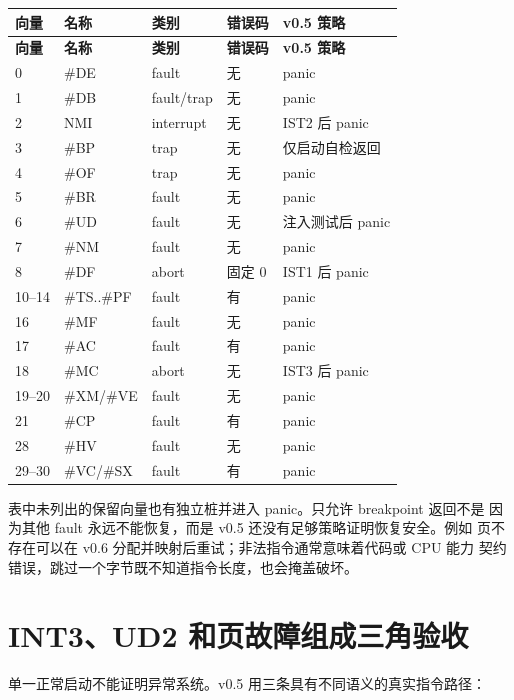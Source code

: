 \begin{longtable}{L{0.08\textwidth}L{0.14\textwidth}L{0.17\textwidth}L{0.20\textwidth}L{0.27\textwidth}}
\toprule
\textbf{向量} & \textbf{名称} & \textbf{类别} & \textbf{错误码} & \textbf{v0.5 策略}\\
\midrule
\endfirsthead
\toprule
\textbf{向量} & \textbf{名称} & \textbf{类别} & \textbf{错误码} & \textbf{v0.5 策略}\\
\midrule
{} & \#DE & fault & 无 & panic\\
1 & \#DB & fault/trap & 无 & panic\\
2 & NMI & interrupt & 无 & IST2 后 panic\\
3 & \#BP & trap & 无 & 仅启动自检返回\\
4 & \#OF & trap & 无 & panic\\
5 & \#BR & fault & 无 & panic\\
6 & \#UD & fault & 无 & 注入测试后 panic\\
7 & \#NM & fault & 无 & panic\\
8 & \#DF & abort & 固定 0 & IST1 后 panic\\
10--14 & \#TS..\#PF & fault & 有 & panic\\
16 & \#MF & fault & 无 & panic\\
17 & \#AC & fault & 有 & panic\\
18 & \#MC & abort & 无 & IST3 后 panic\\
19--20 & \#XM/\#VE & fault & 无 & panic\\
21 & \#CP & fault & 有 & panic\\
28 & \#HV & fault & 无 & panic\\
29--30 & \#VC/\#SX & fault & 有 & panic\\
\bottomrule
\end{longtable}

表中未列出的保留向量也有独立桩并进入 panic。只允许 breakpoint 返回不是
因为其他 fault 永远不能恢复，而是 v0.5 还没有足够策略证明恢复安全。例如
页不存在可以在 v0.6 分配并映射后重试；非法指令通常意味着代码或 CPU 能力
契约错误，跳过一个字节既不知道指令长度，也会掩盖破坏。

\section{INT3、UD2 和页故障组成三角验收}

单一正常启动不能证明异常系统。v0.5 用三条具有不同语义的真实指令路径：

